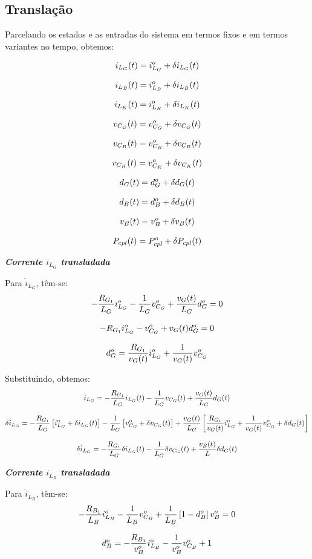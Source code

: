 \documentclass{article}
\newcommand{\nle}{%
  \notag \\[8pt]
}
\begin{document}
\subsection*{Translação}

Parcelando os estados e as entradas do sistema em termos fixos e em termos variantes no tempo, obtemos:

\begin{gather}
  i_{L_G}(t) = i_{L_G}^o + \delta i_{L_G}(t) \nle
  i_{L_B}(t) = i_{L_B}^o + \delta i_{L_B}(t) \nle
  i_{L_K}(t) = i_{L_K}^o + \delta i_{L_K}(t) \nle
  v_{C_G}(t) = v_{C_G}^o + \delta v_{C_G}(t) \nle
  v_{C_B}(t) = v_{C_B}^o + \delta v_{C_B}(t) \nle
  v_{C_K}(t) = v_{C_K}^o + \delta v_{C_K}(t) \nle
  d_G(t) = d_G^o + \delta d_G(t) \nle
  d_B(t) = d_B^o + \delta d_B(t) \nle
  v_B(t) = v_B^o + \delta v_B(t) \nle
  P_{cpl}(t) = P_{cpl}^o + \delta P_{cpl}(t)
\end{gather}

\textbf{\textit{Corrente $i_{L_G}$ transladada}} \vspace*{12pt}

Para $\dot{i}_{L_G}$, têm-se:
\begin{gather}
  - \frac{R_{G_1}}{L_G} i_{L_G}^o - \frac{1}{L_G} v_{C_G}^o + \frac{v_G(t)}{L_G} d_G^o = 0 \nle
  - R_{G_1} i_{L_G}^o - v_{C_G}^o + v_G(t) d_G^o = 0 \nle
  d_G^o = \frac{R_{G_1}}{v_G(t)} i_{L_G}^o + \frac{1}{v_G(t)} v_{C_G}^o
\end{gather}

Substituindo, obtemos:
\begin{gather}
  \dot{i}_{L_G} = - \frac{R_{G_1}}{L_G} i_{L_G}(t) - \frac{1}{L_G} v_{C_G}(t) + \frac{v_G(t)}{L_G} d_G(t) \nle
  \delta \dot{i}_{L_G} = - \frac{R_{G_1}}{L_G} \left[i_{L_G}^o + \delta i_{L_G}(t)\right]
  - \frac{1}{L_G} \left[v_{C_G}^o + \delta v_{C_G}(t)\right]
  + \frac{v_G(t)}{L_G} \left[\frac{R_{G_1}}{v_G(t)} i_{L_G}^o + \frac{1}{v_G(t)} v_{C_G}^o + \delta d_G(t)\right] \nle
  \delta \dot{i}_{L_G} = - \frac{R_{G_1}}{L_G} \delta i_{L_G}(t) - \frac{1}{L_G} \delta v_{C_G}(t) + \frac{v_B(t)}{L} \delta d_G(t)
\end{gather}

\textbf{\textit{Corrente $i_{L_B}$ transladada}} \vspace*{12pt}

Para $\dot{i}_{L_B}$, têm-se:
\begin{gather}
  - \frac{R_{B_1}}{L_B} i_{L_B}^o - \frac{1}{L_B} v_{C_B} ^o + \frac{1}{L_B} \left[1 - d_B^o\right] v_B^o = 0 \nle
  d_B^o = -\frac{R_{B_1}}{v_B^o} i_{L_B}^o - \frac{1}{v_B^o} v_{C_B}^o + 1
\end{gather}
\end{document}
